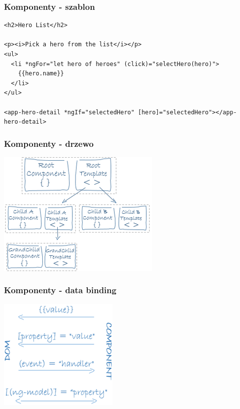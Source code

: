 \documentclass{beamer}
\begin{document}
\begin{frame}[fragile]
    \frametitle{Komponenty - szablon}
\begin{lstlisting}
<h2>Hero List</h2>

<p><i>Pick a hero from the list</i></p>
<ul>
  <li *ngFor="let hero of heroes" (click)="selectHero(hero)">
    {{hero.name}}
  </li>
</ul>

<app-hero-detail *ngIf="selectedHero" [hero]="selectedHero"></app-hero-detail>
\end{lstlisting}
\end{frame}

\begin{frame}
    \frametitle{Komponenty - drzewo}
    \begin{center}
	\includegraphics[scale=0.4]{component-tree.png}
    \end{center}
\end{frame}

\begin{frame}
    \frametitle{Komponenty - data binding}
    \begin{center}
	\includegraphics[scale=0.4]{databinding.png}
    \end{center}
\end{frame}
\end{document}
